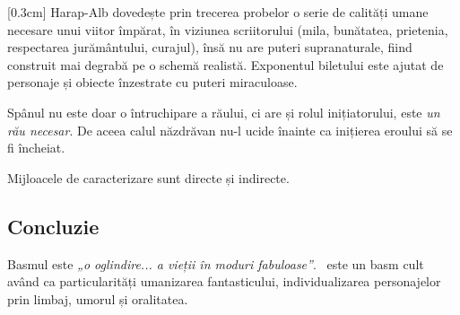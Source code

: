 [0.3cm]
Harap-Alb dovedește prin trecerea probelor o serie de calități umane necesare unui viitor împărat, în viziunea scriitorului (mila, bunătatea, prietenia, respectarea jurământului, curajul), însă nu are puteri supranaturale, fiind construit mai degrabă pe o schemă realistă. Exponentul biletului este ajutat de personaje și obiecte înzestrate cu puteri miraculoase.

Spânul nu este doar o întruchipare a răului, ci are și rolul inițiatorului, este \textit{un rău necesar}. De aceea calul năzdrăvan nu-l ucide înainte ca inițierea eroului să se fi încheiat.

Mijloacele de caracterizare sunt directe și indirecte.


\subsection{Concluzie}

Basmul este \textit{„o oglindire... a vieții în moduri fabuloase”}. \operatitle\ este un basm cult având ca particularități umanizarea fantasticului, individualizarea personajelor prin limbaj, umorul și oralitatea.

